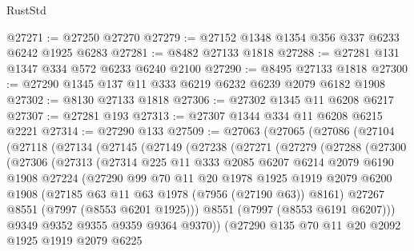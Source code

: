 \begin{lexlean}{RustStd}
\begin{coremodule}
@27271 := @27250 @27270
@27279 := @27152 @1348 @1354 @356 @337 @6233 @6242 @1925 @6283
@27281 := @8482 @27133 @1818
@27288 := @27281 @131 @1347 @334 @572 @6233 @6240 @2100
@27290 := @8495 @27133 @1818
@27300 := @27290 @1345 @137 @11 @333 @6219 @6232 @6239 @2079 @6182 @1908
@27302 := @8130 @27133 @1818
@27306 := @27302 @1345 @11 @6208 @6217
@27307 := @27281 @193
@27313 := @27307 @1344 @334 @11 @6208 @6215 @2221
@27314 := @27290 @133
@27509 := @27063
    (@27065
      (@27086
        (@27104
          (@27118
            (@27134
              (@27145
                (@27149
                  (@27238
                    (@27271
                      (@27279
                        (@27288
                          (@27300
                            (@27306
                              (@27313
                                (@27314
                                  @225
                                  @11
                                  @333
                                  @2085
                                  @6207
                                  @6214
                                  @2079
                                  @6190
                                  @1908
                                  @27224
                                  (@27290
                                    @99
                                    @70
                                    @11
                                    @20
                                    @1978
                                    @1925
                                    @1919
                                    @2079
                                    @6200
                                    @1908
                                    (@27185 @63 @11 @63 @1978 (@7956 (@27190 @63)) @8161)
                                    @27267
                                    @8551
                                    (@7997 (@8553 @6201 @1925)))
                                  @8551
                                  (@7997 (@8553 @6191 @6207)))
                                @9349
                                @9352
                                @9355
                                @9359
                                @9364
                                @9370))
                            (@27290
                              @135
                              @70
                              @11
                              @20
                              @2092
                              @1925
                              @1919
                              @2079
                              @6225

\end{coremodule}
\end{lexlean}

